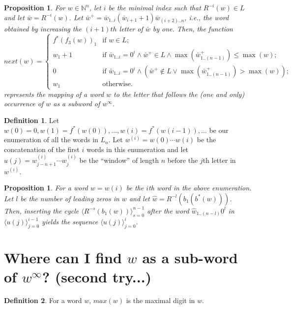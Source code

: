 \documentclass{article}
\newtheorem{proposition}[theorem]{Proposition}
\theoremstyle{definition}
\newtheorem{definition}{Definition}
\newcommand{\N}{{\mathbb{N}}}
\newcommand{\T}[1]{\langle{#1}\rangle}
\newcommand{\rl}[2]{R^{-{#2}}({#1})}
\begin{document}
\begin{proposition}
	For $w \in \N^n$, let $i$ be the minimal index such that $\rl{w}{i} \in L$ and let $\bar{w}=\rl{w}{i}$. Let $\bar{w}^+=\bar{w}_{1..i}(\bar{w}_{i+1}+1)\bar{w}_{(i+2)..n}$, i.e., the word obtained by increasing the $(i+1)th$ letter of $\bar{w}$ by one.  Then, the function
	$$next(w)=
	\begin{cases}
	f^*(f_3(w))_1 & \text{if } w \in L; \\
	w_1+1         & \text{if }\bar{w}_{1..i}= 0^i \wedge \bar{w}^+ \in L\wedge \max{(\bar{w}^+_{1..(n-1)})} \leq \max(w); \\
	0             & \text{if }\bar{w}_{1..i}= 0^i \wedge (\bar{w}^+ \notin L \vee \max{(\bar{w}^+_{1..(n-1)})} > \max(w)); \\
	w_1           & \text{otherwise.}
	\end{cases}$$
	represents the mapping of a word $w$ to the letter that follows the (one and only) occurrence of $w$ as a subword of $w^\infty$.
\end{proposition}

\begin{definition}
	Let $w(0)=0, w(1)=f^*(w(0)),\dots,w(i)=f^*(w{(i-1)}),\dots$ be our enumeration of all the words in $L_n$. Let $w^{(i)}=w(0)\cdots w(i)$ be the concatenation of the first $i$ words in this enumeration and let $u(j)=w^{(i)}_{j-n+1}\cdots w^{(i)}_j$ be the ``window'' of length $n$ before the $j$th letter in $w^{(i)}$.
\end{definition}

\begin{proposition}
	For a word $w=w(i)$ be the $i$th word in the above enumeration. Let $l$ be the number of leading zeros in $w$ and let $\hat{w}=\rl{b_1(b^*(w))}{l}$. Then, inserting the cycle $\T{\rl{b_1(w)}{s}}_{s=0}^{n-1}$ after the word $\hat{w}_{1..(n-l)}0^l$ in $\T{u(j)}_{j=0}^{i-1}$ yields the sequence $\T{u(j)}_{j=0}^{i}$.
\end{proposition}		
	


\section{Where can I find $w$ as a sub-word of $w^\infty$? (second try...)}
		
\begin{definition}
For a word $w$, $max(w)$ is the maximal digit in $w$.
\end{definition}
\end{document}
